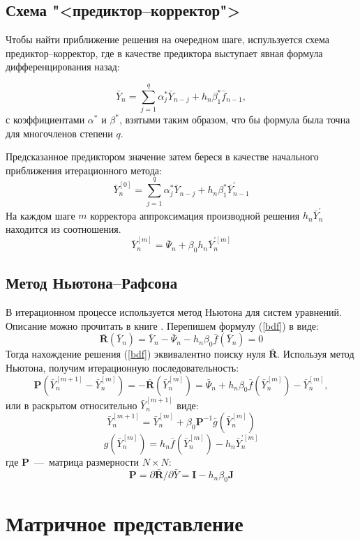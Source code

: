 \documentclass[oneside,final,14pt]{extreport}
\begin{document}
\subsection{Схема "<предиктор--корректор">}
Чтобы найти приближение решения на очередном шаге, испульзуется схема предиктор--корректор, где в качестве предиктора выступает явная формула дифференцирования назад:

\[\bar Y_n=\sum_{j=1}^{q} \alpha_j^*\bar Y_{n-j}+h_n\beta_1^*\bar f_{n-1},\]
с коэффициентами \(\alpha^*\) и \(\beta^*\), взятыми таким образом, что бы формула была точна для многочленов степени \(q\).

Предсказанное предиктором значение затем береся в качестве начального приближения итерационного метода:
\[\bar Y_n^{[0]}=\sum_{j=1}^{q} \alpha_j^*\bar Y_{n-j}+h_n\beta_1^*\bar Y_{n-1}^{'}\]
 На каждом шаге \(m\) корректора аппроксимация производной решения \(h_n\bar Y_n^{'}\) находится из соотношения.
\begin{equation}
\bar Y_n^{[m]}=\bar\Psi_n+\beta_0 h_n\bar Y_n^{'[m]}
\end{equation}

\subsection{Метод Ньютона--Рафсона}
В итерационном процессе используется метод Ньютона для систем уравнений. Описание можно прочитать в книге \cite{andreev}. Перепишем формулу (\ref{bdf}) в виде:
\[
\mathbf{\bar R}(\bar Y_n)= \bar Y_n-\bar\Psi_n-h_n\beta_0\bar f(\bar Y_n)=0
\]
Тогда нахождение решения (\ref{bdf}) эквивалентно поиску нуля \(\mathbf{\bar R}\). Используя метод Ньютона, получим итерационную последовательность:
\[
\mathbf P(\bar Y_n^{[m+1]}-\bar Y_n^{[m]})=-\mathbf{\bar R}(\bar Y_n^{[m]})=\bar\Psi_n+h_n\beta_0\bar f(\bar Y_n^{[m]})-\bar Y_n^{[m]}
,\]
или в раскрытом относительно \(\bar Y_n^{[m+1]}\) виде:
\begin{equation}
\label{newton}
\bar Y_n^{[m+1]}=\bar Y_n^{[m]}+\beta_0\mathbf P^{-1}\bar g(\bar Y_n^{[m]})
\end{equation}
\[
g(\bar Y_n^{[m]})=h_n\bar f(\bar Y_n^{[m]})-h_n\bar Y_n^{'[m]}
\]
где \(\mathbf P\)~---~матрица размерности \(N\times N\):
\[
\mathbf P=\partial\mathbf{\bar R} / \partial\bar Y=\mathbf I-h_n\beta_0 \mathbf J
\]


\section{Матричное представление}
\end{document}
